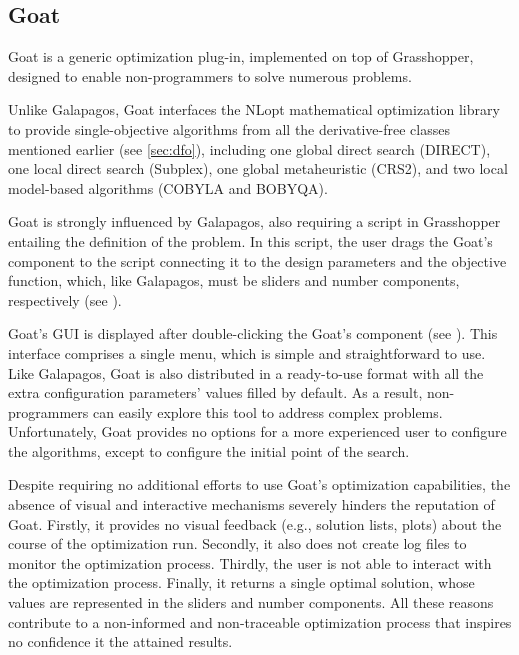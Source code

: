 \subsection{Goat}
Goat \cite{GOAT} is a generic optimization plug-in, implemented on top of Grasshopper, designed to enable non-programmers to solve numerous problems.

Unlike Galapagos, Goat interfaces the NLopt mathematical optimization library~\cite{NLOPT} to provide single-objective algorithms from all the derivative-free classes mentioned earlier (see \cref{sec:dfo}), including one global direct search (DIRECT), one local direct search (Subplex), one global metaheuristic (CRS2), and two local model-based algorithms (COBYLA and BOBYQA). 

Goat is strongly influenced by Galapagos, also requiring a script in Grasshopper entailing the definition of the problem. In this script, the user drags the Goat's component to the script connecting it to the design parameters and the objective function, which, like Galapagos, must be sliders and number components, respectively (see ).

Goat's \ac{GUI} is displayed after double-clicking the Goat's component (see ). This interface comprises a single menu, which is simple and straightforward to use. Like Galapagos, Goat is also distributed in a ready-to-use format with all the extra configuration parameters' values filled by default. As a result, non-programmers can easily explore this tool to address complex problems. Unfortunately, Goat provides no options for a more experienced user to configure the algorithms, except to configure the initial point of the search.

Despite requiring no additional efforts to use Goat's optimization capabilities, the absence of visual and interactive mechanisms severely hinders the reputation of Goat. Firstly, it provides no visual feedback (e.g., solution lists, plots) about the course of the optimization run. Secondly, it also does not create log files to monitor the optimization process. Thirdly, the user is not able to interact with the optimization process. Finally, it returns a single optimal solution, whose values are represented in the sliders and number components. All these reasons contribute to a non-informed and non-traceable optimization process that inspires no confidence it the attained results. 

